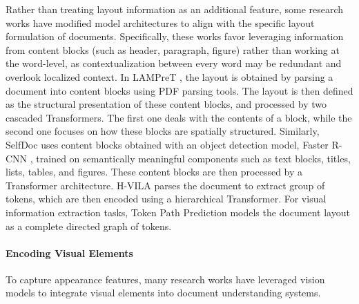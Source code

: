 Rather than treating layout information as an additional feature, some research works have modified model architectures to align with the specific layout formulation of documents. Specifically, these works favor leveraging information from content blocks (such as header, paragraph, figure) rather than working at the word-level, as contextualization between every word may be redundant and overlook localized context. In \ac{LAMPreT} \citep{wu2021lampret}, the layout is obtained by parsing a document into content blocks using PDF parsing tools. The layout is then defined as the structural presentation of these content blocks, and processed by two cascaded Transformers. The first one deals with the contents of a block, while the second one focuses on how these blocks are spatially structured. Similarly, SelfDoc \citep{li2021selfdoc} uses content blocks obtained with an object detection model, Faster R-CNN \citep{ren2015faster}, trained on semantically meaningful components such as text blocks, titles, lists, tables, and figures. These content blocks are then processed by a Transformer architecture. H-VILA \citep{shen2022vila} parses the document to extract group of tokens, which are then encoded using a hierarchical Transformer. For visual information extraction tasks, Token Path Prediction \citep{zhang2023reading} models the document layout as a complete directed graph of tokens.


\paragraph{Encoding Visual Elements} 

To capture appearance features, many research works have leveraged vision models to integrate visual elements into document understanding systems.


